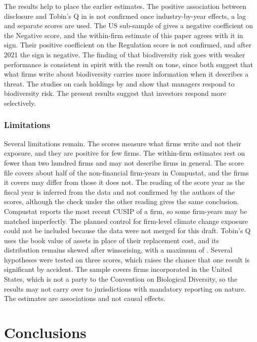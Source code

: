 \documentclass[12pt,a4paper]{article}
\begin{document}
The results help to place the earlier estimates. The positive association between disclosure and Tobin's Q in \citet{he2024} is not confirmed once industry-by-year effects, a lag and separate scores are used. The US sub-sample of \citet{cosma2025} gives a negative coefficient on the Negative score, and the within-firm estimate of this paper agrees with it in sign. Their positive coefficient on the Regulation score is not confirmed, and after 2021 the sign is negative. The finding of \citet{bach2025} that biodiversity risk goes with weaker performance is consistent in spirit with the result on tone, since both suggest that what firms write about biodiversity carries more information when it describes a threat. The studies on cash holdings by \citet{ahmad2024} and \citet{wang2026} show that managers respond to biodiversity risk. The present results suggest that investors respond more selectively.

\subsubsection{Limitations}

Several limitations remain. The scores measure what firms write and not their exposure, and they are positive for few firms. The within-firm estimates rest on fewer than two hundred firms and may not describe firms in general. The score file covers about half of the non-financial firm-years in Compustat, and the firms it covers may differ from those it does not. The reading of the score year as the fiscal year is inferred from the data and not confirmed by the authors of the scores, although the check under the other reading gives the same conclusion. Compustat reports the most recent CUSIP of a firm, so some firm-years may be matched imperfectly. The planned control for firm-level climate change exposure \citep{sautner2023} could not be included because the data were not merged for this draft. Tobin's Q uses the book value of assets in place of their replacement cost, and its distribution remains skewed after winsorising, with a maximum of \maxQ{}. Several hypotheses were tested on three scores, which raises the chance that one result is significant by accident. The sample covers firms incorporated in the United States, which is not a party to the Convention on Biological Diversity, so the results may not carry over to jurisdictions with mandatory reporting on nature. The estimates are associations and not causal effects.

\section{Conclusions}
\end{document}

